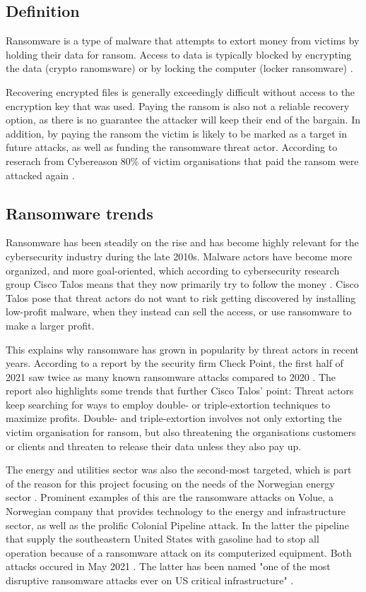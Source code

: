 \subsection{Definition}
Ransomware is a type of \gls{malware} that attempts to extort money from victims by holding their data for ransom. Access to data is typically blocked by encrypting the data (crypto ranomsware) or by locking the computer (locker ransomware) \cite{hassan_ransomware_2019}.

Recovering encrypted files is generally exceedingly difficult without access to the encryption key that was used. Paying the ransom is also not a reliable recovery option, as there is no guarantee the attacker will keep their end of the bargain. In addition, by paying the ransom the victim is likely to be marked as a target in future attacks, as well as funding the ransomware threat actor. According to reserach from Cybereason 80\% of victim organisations that paid the ransom were attacked again \cite{noauthor_new_nodate}.

\subsection{Ransomware trends}

Ransomware has been steadily on the rise and has become highly relevant for the cybersecurity industry during the late 2010s. Malware actors have become more organized, and more goal-oriented, which according to cybersecurity research group Cisco Talos means that they now primarily try to follow the money \cite{stemland_cyberkriminelle_2021}. Cisco Talos pose that threat actors do not want to risk getting discovered by installing low-profit malware, when they instead can sell the access, or use ransomware to make a larger profit. 

This explains why ransomware has grown in popularity by threat actors in recent years. According to a report by the security firm Check Point, the first half of 2021 saw twice as many known ransomware attacks compared to 2020 \cite{noauthor_new_2021}. The report also highlights some trends that further Cisco Talos’ point: Threat actors keep searching for ways to employ double- or triple-extortion techniques to maximize profits. Double- and triple-extortion involves not only extorting the victim organisation for ransom, but also threatening the organisations customers or clients and threaten to release their data unless they also pay up. 

The energy and utilities sector was also the second-most targeted, which is part of the reason for this project focusing on the needs of the Norwegian energy sector \cite{noauthor_new_2021}. Prominent examples of this are the ransomware attacks on Volue, a Norwegian company that provides technology to the energy and infrastructure sector, as well as the prolific Colonial Pipeline attack. In the latter the pipeline that supply the southeastern United States with gasoline had to stop all operation because of a ransomware attack on its computerized equipment. Both attacks occured in May 2021 \cite{stupp_energy_2021}. The latter has been named "one of the most disruptive ransomware attacks ever on US critical infrastructure" \cite{thomas_state_2021}. \label{EnergyAttacks}

